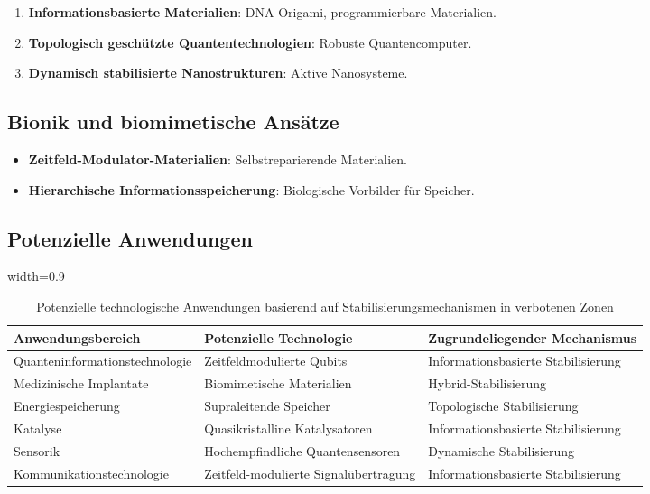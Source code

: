 \documentclass[12pt,a4paper]{article}
\newcommand{\tablescale}{0.9}
\begin{document}
	\begin{enumerate}
		\item \textbf{Informationsbasierte Materialien}: DNA-Origami, programmierbare Materialien.
		\item \textbf{Topologisch geschützte Quantentechnologien}: Robuste Quantencomputer.
		\item \textbf{Dynamisch stabilisierte Nanostrukturen}: Aktive Nanosysteme.
	\end{enumerate}
	
	\subsection{Bionik und biomimetische Ansätze}
	\label{subsec:bionik}
	
	\begin{itemize}
		\item \textbf{Zeitfeld-Modulator-Materialien}: Selbstreparierende Materialien.
		\item \textbf{Hierarchische Informationsspeicherung}: Biologische Vorbilder für Speicher.
	\end{itemize}
	
	\subsection{Potenzielle Anwendungen}
	\label{subsec:potenzielle_anwendungen}
	
	\begin{table}[H]
		\centering
		\begin{adjustbox}{width=\tablescale\textwidth}
			\begin{tabular}{lll}
				\toprule
				\textbf{Anwendungsbereich} & \textbf{Potenzielle Technologie} & \textbf{Zugrundeliegender Mechanismus} \\
				\midrule
				Quanteninformationstechnologie & Zeitfeldmodulierte Qubits & Informationsbasierte Stabilisierung \\
				Medizinische Implantate & Biomimetische Materialien & Hybrid-Stabilisierung \\
				Energiespeicherung & Supraleitende Speicher & Topologische Stabilisierung \\
				Katalyse & Quasikristalline Katalysatoren & Informationsbasierte Stabilisierung \\
				Sensorik & Hochempfindliche Quantensensoren & Dynamische Stabilisierung \\
				Kommunikationstechnologie & Zeitfeld-modulierte Signalübertragung & Informationsbasierte Stabilisierung \\
				\bottomrule
			\end{tabular}
		\end{adjustbox}
		\caption{Potenzielle technologische Anwendungen basierend auf Stabilisierungsmechanismen in verbotenen Zonen}
		\label{tab:applications}
	\end{table}
	
\end{document}
